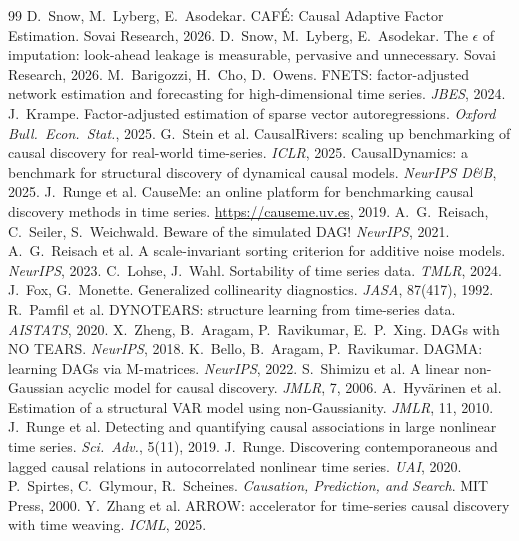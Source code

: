 \documentclass[10pt,twocolumn]{article}
\newcommand{\cafe}{CAF\'E}
\begin{document}
\begin{thebibliography}{99}\scriptsize\setlength{\itemsep}{-2.5pt}
\setlength{\parsep}{0pt}
 D.~Snow, M.~Lyberg, E.~Asodekar. \cafe{}: Causal Adaptive Factor
  Estimation. Sovai Research, 2026.
 D.~Snow, M.~Lyberg, E.~Asodekar. The $\epsilon$ of imputation:
  look-ahead leakage is measurable, pervasive and unnecessary. Sovai Research, 2026.
 M.~Barigozzi, H.~Cho, D.~Owens. FNETS: factor-adjusted network
  estimation and forecasting for high-dimensional time series. \emph{JBES}, 2024.
 J.~Krampe. Factor-adjusted estimation of sparse vector
  autoregressions. \emph{Oxford Bull.\ Econ.\ Stat.}, 2025.
 G.~Stein et al. CausalRivers: scaling up benchmarking of causal
  discovery for real-world time-series. \emph{ICLR}, 2025.
 CausalDynamics: a benchmark for structural discovery of
  dynamical causal models. \emph{NeurIPS D\&B}, 2025.
 J.~Runge et al. CauseMe: an online platform for benchmarking causal
  discovery methods in time series. \url{https://causeme.uv.es}, 2019.
 A.~G.~Reisach, C.~Seiler, S.~Weichwald. Beware of the simulated
  DAG! \emph{NeurIPS}, 2021.
 A.~G.~Reisach et al. A scale-invariant sorting criterion for
  additive noise models. \emph{NeurIPS}, 2023.
 C.~Lohse, J.~Wahl. Sortability of time series data. \emph{TMLR},
  2024.
 J.~Fox, G.~Monette. Generalized collinearity diagnostics.
  \emph{JASA}, 87(417), 1992.
 R.~Pamfil et al. DYNOTEARS: structure learning from time-series
  data. \emph{AISTATS}, 2020.
 X.~Zheng, B.~Aragam, P.~Ravikumar, E.~P.~Xing. DAGs with NO TEARS.
  \emph{NeurIPS}, 2018.
 K.~Bello, B.~Aragam, P.~Ravikumar. DAGMA: learning DAGs via M-matrices.
  \emph{NeurIPS}, 2022.
 S.~Shimizu et al. A linear non-Gaussian acyclic model for causal
  discovery. \emph{JMLR}, 7, 2006.
 A.~Hyv\"arinen et al. Estimation of a structural VAR model using
  non-Gaussianity. \emph{JMLR}, 11, 2010.
 J.~Runge et al. Detecting and quantifying causal associations in
  large nonlinear time series. \emph{Sci.\ Adv.}, 5(11), 2019.
 J.~Runge. Discovering contemporaneous and lagged causal relations in
  autocorrelated nonlinear time series. \emph{UAI}, 2020.
 P.~Spirtes, C.~Glymour, R.~Scheines. \emph{Causation, Prediction,
  and Search}. MIT Press, 2000.
 Y.~Zhang et al. ARROW: accelerator for time-series causal discovery
  with time weaving. \emph{ICML}, 2025.
\end{thebibliography}
\end{document}
